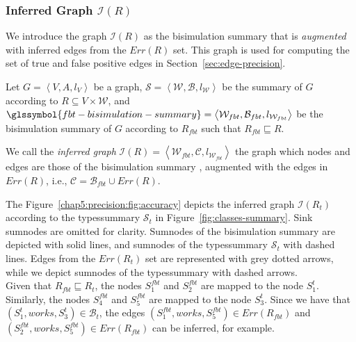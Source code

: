 \subsubsection{Inferred Graph $\mathcal{I}(R)$}

We introduce the graph $\mathcal{I}(R)$ as the bisimulation summary  that is \emph{augmented} with inferred edges from the $Err(R)$ set. This graph is used for computing the set of true and false positive edges in Section~\ref{sec:edge-precision}.

\begin{definition}
Let $G=\left\langle V, A, l_V \right\rangle$ be a graph, $\mathcal{S} = \left\langle \mathcal{W}, \mathcal{B}, l_{\mathcal{W}} \right\rangle$ be the summary of $G$ according to $R \subseteq V \times \mathcal{W}$, and $\glssymbol{fbt-bisimulation-summary} = \left\langle \mathcal{W}_{fbt}, \mathcal{B}_{fbt}, l_{\mathcal{W}_{fbt}} \right\rangle$ be the bisimulation summary of $G$ according to $R_{fbt}$ such that $R_{fbt} \sqsubseteq R$.

We call the \emph{inferred graph} $\mathcal{I}(R) = \left\langle \mathcal{W}_{fbt}, \mathcal{C}, l_{\mathcal{W}_{fbt}} \right\rangle$ the graph which nodes and edges are those of the bisimulation summary , augmented with the edges in $Err(R)$, i.e., $\mathcal{C} = \mathcal{B}_{fbt} \cup Err(R)$.
\end{definition}

The Figure~\ref{chap5:precision:fig:accuracy} depicts the inferred graph $\mathcal{I}(R_t)$ according to the \gls{typessummary} $\mathcal{S}_t$ in Figure~\ref{fig:classes-summary}.
Sink sumnodes are omitted for clarity. Sumnodes of the bisimulation summary  are depicted with solid lines, and sumnodes of the \gls{typessummary} $\mathcal{S}_t$ with dashed lines. Edges from the $Err(R_t)$ set are represented with grey dotted arrows, while we depict sumnodes of the \gls{typessummary} with dashed arrows.\\

Given that $R_{fbt} \sqsubseteq R_t$, the nodes $S^{fbt}_1$ and $S^{fbt}_2$ are mapped to the node $S^t_1$. Similarly, the nodes $S^{fbt}_4$ and $S^{fbt}_5$ are mapped to the node $S^t_3$. Since we have that $(S^t_1, works, S^t_3) \in \mathcal{B}_t$, the edges $(S^{fbt}_1, works, S^{fbt}_5) \in Err(R_{fbt})$ and $(S^{fbt}_2, works, S^{fbt}_5) \in Err(R_{fbt})$ can be inferred, for example.

